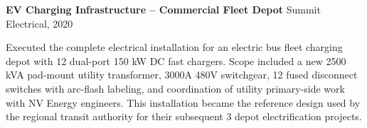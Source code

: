 \documentclass[11pt,letterpaper]{article}
\begin{document}
\vspace{0.35cm}

\noindent
\textbf{\color{primary}EV Charging Infrastructure -- Commercial Fleet Depot} \hfill \small\color{primary!70}Summit Electrical, 2020

\vspace{3pt}
Executed the complete electrical installation for an electric bus fleet charging depot with 12 dual-port 150 kW DC fast chargers. Scope included a new 2500 kVA pad-mount utility transformer, 3000A 480V switchgear, 12 fused disconnect switches with arc-flash labeling, and coordination of utility primary-side work with NV Energy engineers. This installation became the reference design used by the regional transit authority for their subsequent 3 depot electrification projects.
\end{document}
